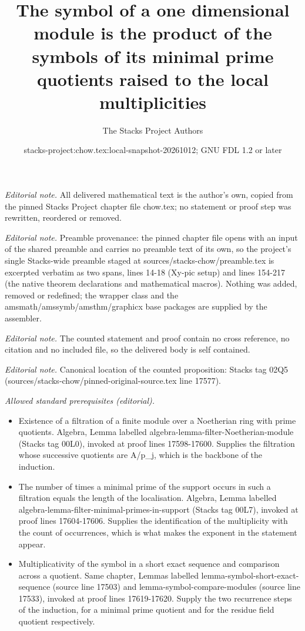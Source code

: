 \documentclass[10pt,a4paper]{amsart}
\title{The symbol of a one dimensional module is the product of the symbols of its minimal prime quotients raised to the local multiplicities}
\author{The Stacks Project Authors}
\date{stacks-project:chow.tex:local-snapshot-20261012; GNU FDL 1.2 or later}
\theoremstyle{plain}
\theoremstyle{definition}
\theoremstyle{remark}
\numberwithin{equation}{subsection}
\begin{document}
\maketitle
\noindent\textit{Editorial note.} All delivered mathematical text is the author's own, copied from the pinned Stacks Project chapter file chow.tex; no statement or proof step was rewritten, reordered or removed.\par\medskip
\noindent\textit{Editorial note.} Preamble provenance: the pinned chapter file opens with an input of the shared preamble and carries no preamble text of its own, so the project's single Stacks-wide preamble staged at sources/stacks-chow/preamble.tex is excerpted verbatim as two spans, lines 14-18 (Xy-pic setup) and lines 154-217 (the native theorem declarations and mathematical macros). Nothing was added, removed or redefined; the wrapper class and the amsmath/amssymb/amsthm/graphicx base packages are supplied by the assembler.\par\medskip
\noindent\textit{Editorial note.} The counted statement and proof contain no cross reference, no citation and no included file, so the delivered body is self contained.\par\medskip
\noindent\textit{Editorial note.} Canonical location of the counted proposition: Stacks tag 02Q5 (sources/stacks-chow/pinned-original-source.tex line 17577).\par\medskip
\noindent\textit{Allowed standard prerequisites (editorial).}\begin{itemize}
\item Existence of a filtration of a finite module over a Noetherian ring with prime quotients. Algebra, Lemma labelled algebra-lemma-filter-Noetherian-module (Stacks tag 00L0), invoked at proof lines 17598-17600. Supplies the filtration whose successive quotients are A/p\_j, which is the backbone of the induction.
\item The number of times a minimal prime of the support occurs in such a filtration equals the length of the localisation. Algebra, Lemma labelled algebra-lemma-filter-minimal-primes-in-support (Stacks tag 00L7), invoked at proof lines 17604-17606. Supplies the identification of the multiplicity with the count of occurrences, which is what makes the exponent in the statement appear.
\item Multiplicativity of the symbol in a short exact sequence and comparison across a quotient. Same chapter, Lemmas labelled lemma-symbol-short-exact-sequence (source line 17503) and lemma-symbol-compare-modules (source line 17533), invoked at proof lines 17619-17620. Supply the two recurrence steps of the induction, for a minimal prime quotient and for the residue field quotient respectively.
\end{itemize}\medskip
\end{document}
